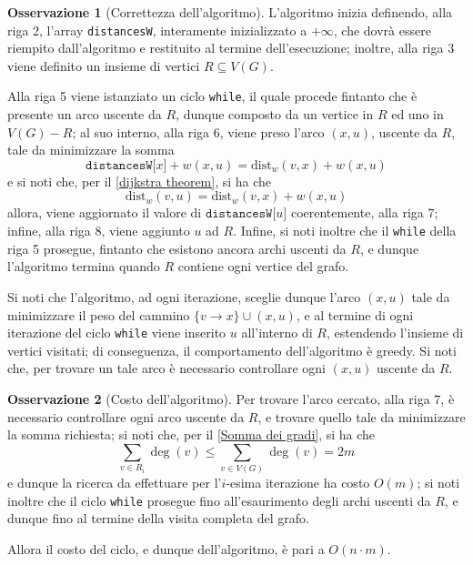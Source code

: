 \documentclass[14pt]{extreport}
\theoremstyle{definition}
\theoremstyle{definition}
\newtheorem{remark}{Osservazione}[subsection]
\begin{document}
\begin{remark}[Correttezza dell'algoritmo]
    L'algoritmo inizia definendo, alla riga 2, l'array \texttt{distancesW}, interamente inizializzato a $+ \infty$, che dovrà essere riempito dall'algoritmo e restituito al termine dell'esecuzione; inoltre, alla riga 3 viene definito un insieme di vertici $R \subseteq V(G)$.

    Alla riga 5 viene istanziato un ciclo \texttt{while}, il quale procede fintanto che è presente un arco uscente da $R$, dunque composto da un vertice in $R$ ed uno in $V(G) - R$; al suo interno, alla riga 6, viene preso l'arco $(x, u)$, uscente da $R$, tale da minimizzare la somma $$\texttt{distancesW[}x\texttt{]} + w(x, u) = \mathrm{dist}_w(v, x) + w(x, u)$$ e si noti che, per il \cref{dijkstra theorem}, si ha che $$\mathrm{dist}_w(v, u) = \mathrm{dist}_w(v, x) + w(x, u)$$ allora, viene aggiornato il valore di $\texttt{distancesW[}u\texttt{]}$ coerentemente, alla riga 7; infine, alla riga 8, viene aggiunto $u$ ad $R$. Infine, si noti inoltre che il \texttt{while} della riga 5 prosegue, fintanto che esistono ancora archi uscenti da $R$, e dunque l'algoritmo termina quando $R$ contiene ogni vertice del grafo.

    Si noti che l'algoritmo, ad ogni iterazione, sceglie dunque l'arco $(x, u)$ tale da minimizzare il peso del cammino $\{v \rightarrow x\} \cup (x, u)$, e al termine di ogni iterazione del ciclo \texttt{while} viene inserito $u$ all'interno di $R$, estendendo l'insieme di vertici visitati; di conseguenza, il comportamento dell'algoritmo è greedy. Si noti che, per trovare un tale arco è necessario controllare ogni $(x, u)$ uscente da $R$.
\end{remark}

\begin{remark}[Costo dell'algoritmo]
    Per trovare l'arco cercato, alla riga 7, è necessario controllare ogni arco uscente da $R$, e trovare quello tale da minimizzare la somma richiesta; si noti che, per il \cref{Somma dei gradi}, si ha che $$\displaystyle \sum_{v \in R_i}{\deg(v)} \le \sum_{v \in V(G)}{\deg(v)} = 2m$$ e dunque la ricerca da effettuare per l'$i$-esima iterazione ha costo $O(m)$; si noti inoltre che il ciclo \texttt{while} prosegue fino all'esaurimento degli archi uscenti da $R$, e dunque fino al termine della visita completa del grafo.

    Allora il costo del ciclo, e dunque dell'algoritmo, è pari a $O(n \cdot m)$.
\end{remark}
\end{document}
